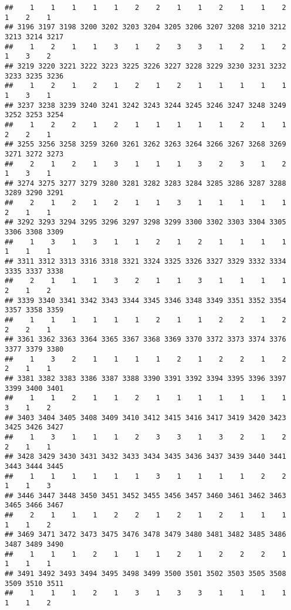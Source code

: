 \documentclass[
]{article}
\begin{document}
\begin{verbatim}
##    1    1    1    1    1    2    2    1    1    2    1    1    2    1    2    1 
## 3196 3197 3198 3200 3202 3203 3204 3205 3206 3207 3208 3210 3212 3213 3214 3217 
##    1    2    1    1    3    1    2    3    3    1    2    1    2    1    3    2 
## 3219 3220 3221 3222 3223 3225 3226 3227 3228 3229 3230 3231 3232 3233 3235 3236 
##    1    2    1    2    1    2    1    2    1    1    1    1    1    1    3    1 
## 3237 3238 3239 3240 3241 3242 3243 3244 3245 3246 3247 3248 3249 3252 3253 3254 
##    1    2    2    1    2    1    1    1    1    1    2    1    1    2    2    1 
## 3255 3256 3258 3259 3260 3261 3262 3263 3264 3266 3267 3268 3269 3271 3272 3273 
##    2    1    2    1    3    1    1    1    3    2    3    1    2    1    3    1 
## 3274 3275 3277 3279 3280 3281 3282 3283 3284 3285 3286 3287 3288 3289 3290 3291 
##    2    1    2    1    2    1    1    3    1    1    1    1    1    2    1    1 
## 3292 3293 3294 3295 3296 3297 3298 3299 3300 3302 3303 3304 3305 3306 3308 3309 
##    1    3    1    3    1    1    2    1    2    1    1    1    1    1    1    1 
## 3311 3312 3313 3316 3318 3321 3324 3325 3326 3327 3329 3332 3334 3335 3337 3338 
##    2    1    1    1    3    2    1    1    3    1    1    1    1    2    1    2 
## 3339 3340 3341 3342 3343 3344 3345 3346 3348 3349 3351 3352 3354 3357 3358 3359 
##    1    1    1    1    1    1    2    1    1    2    2    1    2    2    2    1 
## 3361 3362 3363 3364 3365 3367 3368 3369 3370 3372 3373 3374 3376 3377 3379 3380 
##    1    3    2    1    1    1    1    2    1    2    2    1    2    2    1    1 
## 3381 3382 3383 3386 3387 3388 3390 3391 3392 3394 3395 3396 3397 3399 3400 3401 
##    1    1    2    1    1    2    1    1    1    1    1    1    1    3    1    2 
## 3403 3404 3405 3408 3409 3410 3412 3415 3416 3417 3419 3420 3423 3425 3426 3427 
##    1    3    1    1    1    2    3    3    1    3    2    1    2    2    1    1 
## 3428 3429 3430 3431 3432 3433 3434 3435 3436 3437 3439 3440 3441 3443 3444 3445 
##    1    1    1    1    1    1    3    1    1    1    1    2    2    1    1    3 
## 3446 3447 3448 3450 3451 3452 3455 3456 3457 3460 3461 3462 3463 3465 3466 3467 
##    2    1    1    1    2    2    1    2    1    2    1    1    1    1    1    2 
## 3469 3471 3472 3473 3475 3476 3478 3479 3480 3481 3482 3485 3486 3487 3489 3490 
##    1    1    1    2    1    1    1    2    1    2    2    2    1    1    1    1 
## 3491 3492 3493 3494 3495 3498 3499 3500 3501 3502 3503 3505 3508 3509 3510 3511 
##    1    1    1    2    1    3    1    3    3    1    1    1    1    1    1    2 

\end{verbatim}
\end{document}
